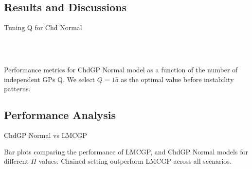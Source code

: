 \subsection{Results and Discussions}

\begin{frame}{Tuning Q for Chd Normal}
	\vspace{-0.8em}
	\begin{figure}[htbp]
		\tiny
		\centering
		\setlength{} 
		\setlength{}
		\subfloat[CRPS]{}
		\subfloat[MSE]{}\\
		\vspace{-0.6em}
		\subfloat[MSLL]{}
		\subfloat[NLPD]{}\\
	\end{figure}
	\vspace{-1.8em}
	\begin{block}{}
		Performance metrics for ChdGP Normal model as a function of the number of independent GPs Q. We select $Q = 15$ as the optimal value before instability patterns.
	\end{block}
\end{frame}

\subsection{Performance Analysis}
\begin{frame}{ChdGP Normal vs LMCGP}
	\begin{figure}[htbp]
		\centering
		\setlength{}
		\setlength{}
		
		\subfloat[NLPD]{}
		\hfill
		\subfloat[MSLL]{}
	\end{figure}
	\vspace{-1em}
	\begin{block}{}
		Bar plots comparing the performance of LMCGP, and ChdGP Normal models for different \(H\) values. Chained setting outperform LMCGP across all scenarios. 
	\end{block}
\end{frame}

